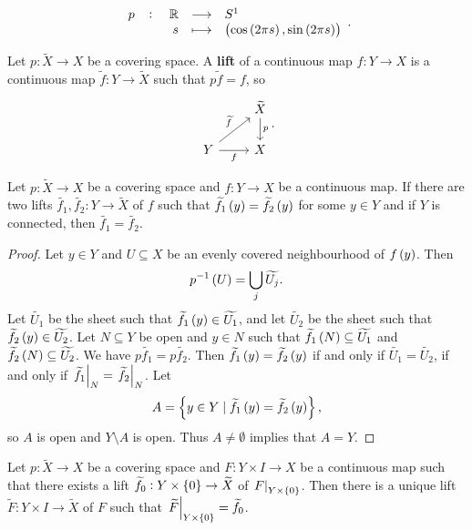 \begin{example*}
$$ \function[p]{\R}{S^1}{s}{\br{\cos\br{2\pi s}, \sin\br{2\pi s}}}. $$
\end{example*}

\begin{definition*}
Let $ p : \widetilde{X} \to X $ be a covering space. A \textbf{lift} of a continuous map $ f : Y \to X $ is a continuous map $ \widetilde{f} : Y \to \widetilde{X} $ such that $ p\widetilde{f} = f $, so
$$
\begin{tikzcd}
& \widetilde{X} \arrow{d}{p} \\
Y \arrow{ur}{\widetilde{f}} \arrow[swap]{r}{f} & X
\end{tikzcd}.
$$
\end{definition*}

\begin{proposition}
\label{prop:1.34}
Let $ p : \widetilde{X} \to X $ be a covering space and $ f : Y \to X $ be a continuous map. If there are two lifts $ \widetilde{f_1}, \widetilde{f_2} : Y \to \widetilde{X} $ of $ f $ such that $ \widetilde{f_1}\br{y} = \widetilde{f_2}\br{y} $ for some $ y \in Y $ and if $ Y $ is connected, then $ \widetilde{f_1} = \widetilde{f_2} $.
\end{proposition}

\begin{proof}
Let $ y \in Y $ and $ U \subseteq X $ be an evenly covered neighbourhood of $ f\br{y} $. Then
$$ p^{-1}\br{U} = \bigcup_j \widetilde{U_j}. $$
Let $ \widetilde{U_1} $ be the sheet such that $ \widetilde{f_1}\br{y} \in \widetilde{U_1} $, and let $ \widetilde{U_2} $ be the sheet such that $ \widetilde{f_2}\br{y} \in \widetilde{U_2} $. Let $ N \subseteq Y $ be open and $ y \in N $ such that $ \widetilde{f_1}\br{N} \subseteq \widetilde{U_1} $ and $ \widetilde{f_2}\br{N} \subseteq \widetilde{U_2} $. We have $ p\widetilde{f_1} = p\widetilde{f_2} $. Then $ \widetilde{f_1}\br{y} = \widetilde{f_2}\br{y} $ if and only if $ \widetilde{U_1} = \widetilde{U_2} $, if and only if $ \left. \widetilde{f_1} \right|_N = \left. \widetilde{f_2} \right|_N $. Let
$$ A = \cbr{y \in Y \mid \widetilde{f_1}\br{y} = \widetilde{f_2}\br{y}}, $$
so $ A $ is open and $ Y \setminus A $ is open. Thus $ A \ne \emptyset $ implies that $ A = Y $.
\end{proof}

\begin{proposition}
\label{prop:1.30}
Let $ p : \widetilde{X} \to X $ be a covering space and $ F : Y \times I \to X $ be a continuous map such that there exists a lift $ \widetilde{f_0} : Y \times \cbr{0} \to \widetilde{X} $ of $ \eval{F}_{Y \times \cbr{0}} $. Then there is a unique lift $ \widetilde{F} : Y \times I \to \widetilde{X} $ of $ F $ such that $ \eval{\widetilde{F}}_{Y \times \cbr{0}} = \widetilde{f_0} $.
\end{proposition}

